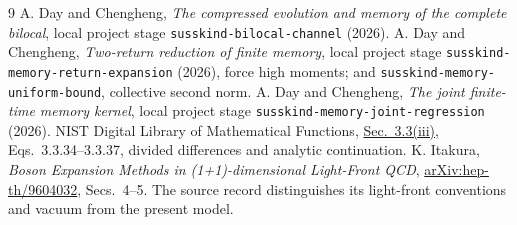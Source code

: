 \documentclass[11pt]{article}
\begin{document}
\begin{thebibliography}{9}
 A. Day and Chengheng,
\emph{The compressed evolution and memory of the complete bilocal},
local project stage \texttt{susskind-bilocal-channel} (2026).
 A. Day and Chengheng,
\emph{Two-return reduction of finite memory}, local project stage
\texttt{susskind-memory-return-expansion} (2026), force high moments;
and \texttt{susskind-memory-uniform-bound}, collective second norm.
 A. Day and Chengheng,
\emph{The joint finite-time memory kernel}, local project stage
\texttt{susskind-memory-joint-regression} (2026).
 NIST Digital Library of Mathematical Functions,
\href{https://dlmf.nist.gov/3.3.iii}{Sec.~3.3(iii)},
Eqs.~3.3.34--3.3.37, divided differences and analytic continuation.
 K. Itakura,
\emph{Boson Expansion Methods in (1+1)-dimensional Light-Front QCD},
\href{https://arxiv.org/abs/hep-th/9604032}{arXiv:hep-th/9604032},
Secs.~4--5. The source record distinguishes its light-front conventions
and vacuum from the present model.
\end{thebibliography}
\end{document}
